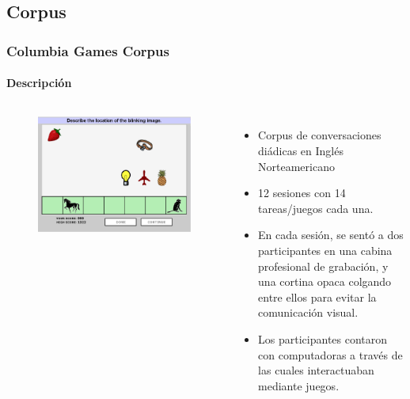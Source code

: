 \subsection{Corpus}
\begin{frame}
  \frametitle{Columbia Games Corpus}
  \framesubtitle{Descripción}
  \begin{columns}
      \begin{figure}
        \includegraphics[width=\textwidth]{images/columbia_games_color.jpg}
      \end{figure}


    \begin{itemize}
      \item Corpus de conversaciones diádicas en Inglés Norteamericano
      \item 12 sesiones con 14 tareas/juegos cada una.
      \item En cada sesión, se sentó a dos participantes en una cabina profesional de grabación, y una cortina opaca colgando entre ellos para evitar la comunicación visual.
      \item Los participantes contaron con computadoras a través de las cuales interactuaban mediante juegos.
    \end{itemize}
  \end{columns}

\end{frame}


